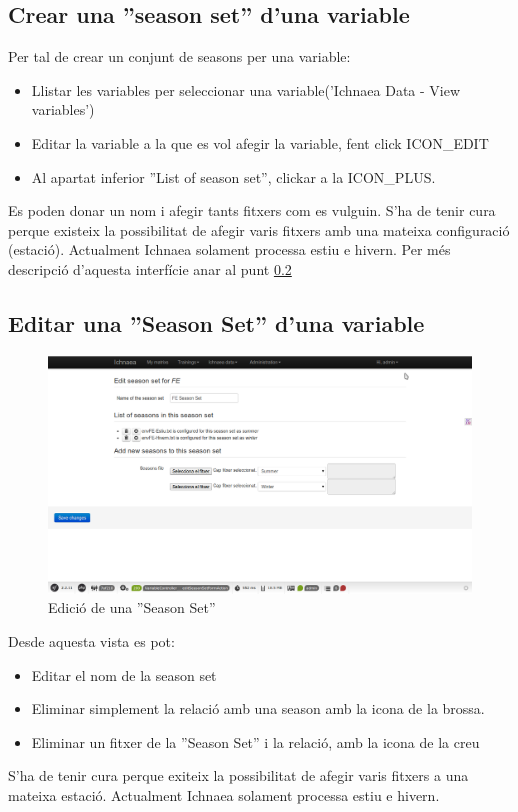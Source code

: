 \subsection{Crear una ''season set'' d'una variable}
\label{season_set:variable}
Per tal de crear un conjunt de seasons per una variable:
\begin{itemize}
\item Llistar les variables per seleccionar una variable('Ichnaea Data - View variables')
\item Editar la variable a la que es vol afegir la variable, fent click ICON_EDIT
\item Al apartat inferior ''List of season set'', clickar a la ICON_PLUS.
\end{itemize}
Es poden donar un nom i afegir tants fitxers com es vulguin. S'ha de tenir cura perque existeix la possibilitat de afegir varis fitxers amb una mateixa configuraci\'{o} (estaci\'{o}). Actualment Ichnaea solament processa estiu e hivern. Per m\'{e}s descripci\'{o} d'aquesta interf\'{i}cie anar al punt \ref{season_set:edit}

\subsection{Editar una ''Season Set'' d'una variable}
\label{season_set:edit}
\begin{figure}[h!]
  \centering
  \includegraphics[scale=0.2]{img/userguide/season_set_edition.png}
  \caption{Edici\'{o} de una ''Season Set''}
  \label{fig:placement}
\end{figure}
Desde aquesta vista es pot:
\begin{itemize}
	\item Editar el nom de la season set
	\item Eliminar simplement la relaci\'{o} amb una season amb la icona de la brossa.	
	\item Eliminar un fitxer de la ''Season Set'' i la relaci\'{o}, amb la icona de la creu	
\end{itemize}
S'ha de tenir cura perque exiteix la possibilitat de afegir varis fitxers a una mateixa estaci\'{o}. Actualment Ichnaea solament processa estiu e hivern.

